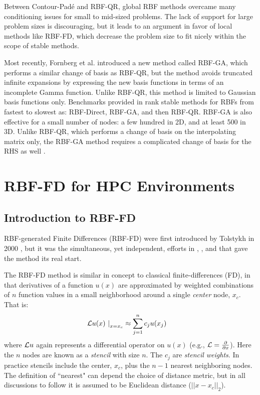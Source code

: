 \documentclass[11pt]{report}
\begin{document}
{Between Contour-Pad\'{e} and RBF-QR, global RBF methods overcame many conditioning issues for small to mid-sized problems. The lack of support for large problem sizes is discouraging, but it leads to an argument in favor of local methods like RBF-FD, which decrease the problem size to fit nicely within the scope of stable methods. %

Most recently, Fornberg et al. \cite{Fornberg2012} introduced a new method called RBF-GA, which performs a similar change of basis as RBF-QR, but the method avoids truncated infinite expansions by expressing the new basis functions in terms of an incomplete Gamma function. Unlike RBF-QR, this method is limited to Gaussian basis functions only. Benchmarks provided in \cite{Fornberg2012} rank stable methods for RBFs from fastest to slowest as: RBF-Direct, RBF-GA, and then RBF-QR. RBF-GA is also effective for a small number of nodes: a few hundred in 2D, and at least 500 in 3D. Unlike RBF-QR, which performs a change of basis on the interpolating matrix only, the RBF-GA method requires a complicated change of basis for the RHS as well \cite{Fornberg2012}.


\part{RBF-FD for HPC Environments}

\chapter{Introduction to RBF-FD}
\label{chap:rbffd_method}



RBF-generated Finite Differences (RBF-FD) were first introduced by Tolstykh in 2000 \cite{Tolstykh2000}, 
but it was the simultaneous, yet independent,
efforts in \cite{Shu2003}, \cite{Tolstykh2003a}, \cite{Wright2003} and \cite{Cecil2004} that gave the method its real start. 

The RBF-FD method 
is similar in concept to classical 
finite-differences (FD), in that derivatives of a function $u(x)$ are approximated by weighted combinations of $n$ function values in a small neighborhood around a single \emph{center} node, $x_c$. That is: 
        \begin{align} 
        \left. \mathcal{L}u(x) \ \right|_{x = x_c} &\approx \sum_{j=1}^{n} c_j u(x_j) 
        \label{eq:derivFromFDWeights}
        \end{align}
where $\mathcal{L}u$ again represents a differential operator on $u(x)$ (e.g., $\mathcal{L} = \frac{\partial }{\partial x}$). Here the $n$ nodes are known as a \emph{stencil} with size $n$. The $c_j$ are \emph{stencil weights}. In practice stencils include the center, $x_c$, plus the $n - 1$ nearest neighboring nodes. The definition of ``nearest" can depend the choice of distance metric, but in all discussions to follow it is assumed to be Euclidean distance ($||x-x_c||_2$). 

}
\end{document}
